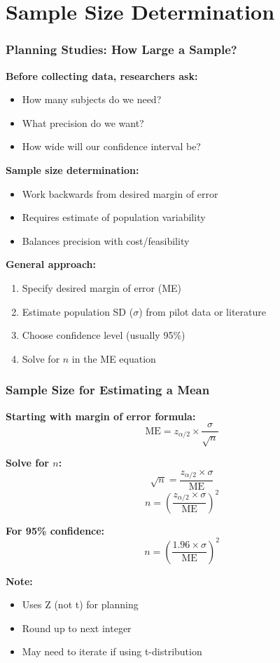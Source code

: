 \documentclass{beamer}
\begin{document}
\section{Sample Size Determination}

\begin{frame}
\frametitle{Planning Studies: How Large a Sample?}
\textbf{Before collecting data, researchers ask:}
\begin{itemize}
\item How many subjects do we need?
\item What precision do we want?
\item How wide will our confidence interval be?
\end{itemize}

\vspace{0.5cm}
\textbf{Sample size determination:}
\begin{itemize}
\item Work backwards from desired margin of error
\item Requires estimate of population variability
\item Balances precision with cost/feasibility
\end{itemize}

\vspace{0.5cm}
\textbf{General approach:}
\begin{enumerate}
\item Specify desired margin of error (ME)
\item Estimate population SD ($\sigma$) from pilot data or literature
\item Choose confidence level (usually 95\%)
\item Solve for $n$ in the ME equation
\end{enumerate}
\end{frame}

\begin{frame}
\frametitle{Sample Size for Estimating a Mean}
\textbf{Starting with margin of error formula:}
$$\text{ME} = z_{\alpha/2} \times \frac{\sigma}{\sqrt{n}}$$

\vspace{0.3cm}
\textbf{Solve for $n$:}
$$\sqrt{n} = \frac{z_{\alpha/2} \times \sigma}{\text{ME}}$$
$$n = \left(\frac{z_{\alpha/2} \times \sigma}{\text{ME}}\right)^2$$

\vspace{0.5cm}
\textbf{For 95\% confidence:}
$$n = \left(\frac{1.96 \times \sigma}{\text{ME}}\right)^2$$

\vspace{0.3cm}
\textbf{Note:}
\begin{itemize}
\item Uses Z (not t) for planning
\item Round up to next integer
\item May need to iterate if using t-distribution
\end{itemize}
\end{frame}
\end{document}
